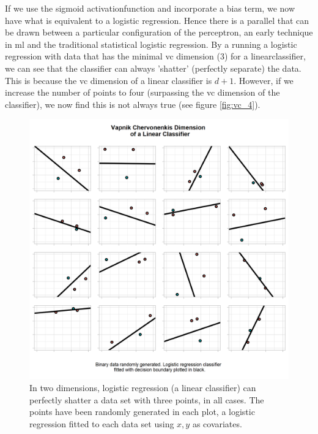 If we use the sigmoid \gls{activationfunction} and incorporate a bias term, we now have what is equivalent to a logistic regression. Hence there is a parallel that can be drawn between a particular configuration of the perceptron, an early technique in \gls{ml} and the traditional statistical logistic regression. By a running a logistic regression with data that has the minimal \gls{vc} dimension (3) for a \gls{linearclassifier}, we can see that the classifier can always 'shatter' (perfectly separate) the data. This is because the \gls{vc} dimension of a linear classifier is $d+1$. However, if we increase the number of points to four (surpassing the \gls{vc} dimension of the classifier), we now find this is not always true (see figure \ref{fig:vc_4}).

\begin{figure}[H]
    \centering
    \includegraphics[width=120mm]{figs/vc_3.png}
    \caption[\Gls{vc} dimension of a linear classifier - the data is shattered.]{In two dimensions, logistic regression (a linear classifier) can perfectly shatter a data set with three points, in all cases. The points have been randomly generated in each plot, a logistic regression fitted to each data set using $x, y$ as covariates.}
    \label{fig:vc_3}
\end{figure}

